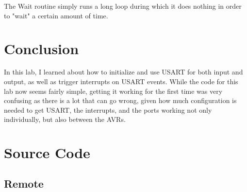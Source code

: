 \documentclass[12pt,letterpaper]{article}
\begin{document}
The Wait routine simply runs a long loop during which it does nothing in order
to "wait" a certain amount of time.

\section{Conclusion}

In this lab, I learned about how to initialize and use USART for both input and
output, as well as trigger interrupts on USART events.  While the code for this
lab now seems fairly simple, getting it working for the first time was very
confusing as there is a lot that can go wrong, given how much configuration is
needed to get USART, the interrupts, and the ports working not only
individually, but also between the AVRs.

\section{Source Code}

\subsection{Remote}
\end{document}
